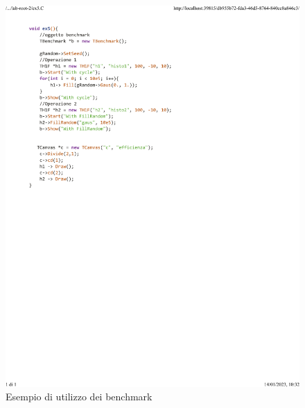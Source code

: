 \documentclass[10pt,a4paper]{article}
\begin{document}
\begin{figure}[h!]
	\centering
	\includegraphics[width=1.\linewidth]{_..._lab-root-2_ex5.C}
	\caption{Esempio di utilizzo dei benchmark}
\end{figure}
\newpage
\end{document}
